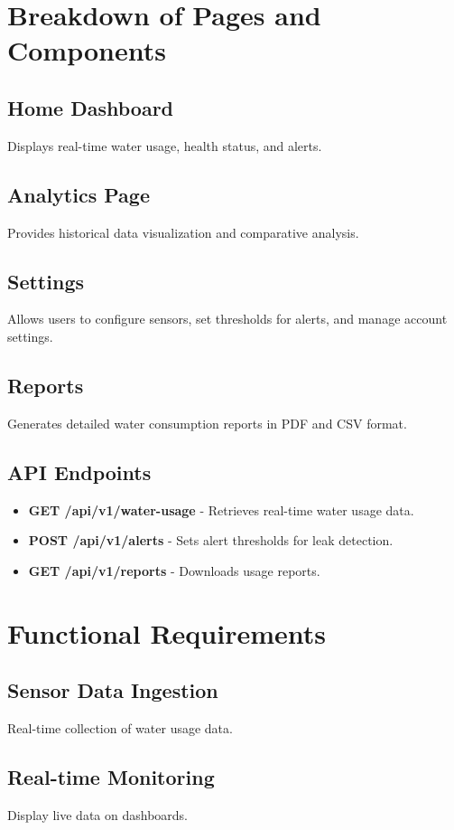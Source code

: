 \documentclass{article}
\begin{document}
\section{Breakdown of Pages and Components}
\subsection{Home Dashboard}
Displays real-time water usage, health status, and alerts.

\subsection{Analytics Page}
Provides historical data visualization and comparative analysis.

\subsection{Settings}
Allows users to configure sensors, set thresholds for alerts, and manage account settings.

\subsection{Reports}
Generates detailed water consumption reports in PDF and CSV format.

\subsection{API Endpoints}
\begin{itemize}
\item \textbf{GET /api/v1/water-usage} - Retrieves real-time water usage data.
\item \textbf{POST /api/v1/alerts} - Sets alert thresholds for leak detection.
\item \textbf{GET /api/v1/reports} - Downloads usage reports.
\end{itemize}

\section{Functional Requirements}
\subsection{Sensor Data Ingestion}
Real-time collection of water usage data.

\subsection{Real-time Monitoring}
Display live data on dashboards.
\end{document}
